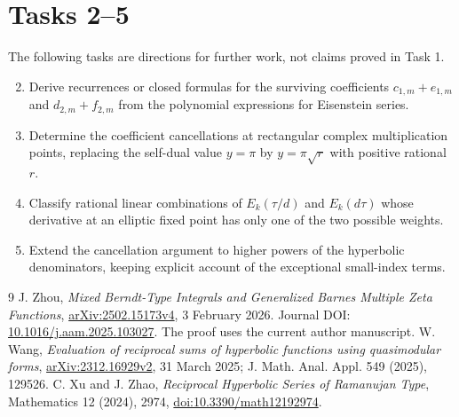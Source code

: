 \documentclass[11pt]{article}
\begin{document}
\section*{Tasks 2--5}
The following tasks are directions for further work, not claims
proved in Task 1.
\begin{enumerate}
\setcounter{enumi}{1}
\item Derive recurrences or closed formulas for the surviving
coefficients $c_{1,m}+e_{1,m}$ and $d_{2,m}+f_{2,m}$ from the
polynomial expressions for Eisenstein series.
\item Determine the coefficient cancellations at rectangular
complex multiplication points, replacing the self-dual value
$y=\pi$ by $y=\pi\sqrt r$ with positive rational $r$.
\item Classify rational linear combinations of
$E_k(\tau/d)$ and $E_k(d\tau)$ whose derivative at an elliptic
fixed point has only one of the two possible weights.
\item Extend the cancellation argument to higher powers of the
hyperbolic denominators, keeping explicit account of the
exceptional small-index terms.
\end{enumerate}

\begin{thebibliography}{9}
 J. Zhou, \emph{Mixed Berndt-Type Integrals and
Generalized Barnes Multiple Zeta Functions},
\href{https://arxiv.org/abs/2502.15173v4}{arXiv:2502.15173v4},
3 February 2026. Journal DOI:
\href{https://doi.org/10.1016/j.aam.2025.103027}
{10.1016/j.aam.2025.103027}.
The proof uses the current author manuscript.
 W. Wang, \emph{Evaluation of reciprocal sums of
hyperbolic functions using quasimodular forms},
\href{https://arxiv.org/abs/2312.16929v2}{arXiv:2312.16929v2},
31 March 2025; J. Math. Anal. Appl. 549 (2025), 129526.
 C. Xu and J. Zhao, \emph{Reciprocal Hyperbolic
Series of Ramanujan Type}, Mathematics 12 (2024), 2974,
\href{https://doi.org/10.3390/math12192974}{doi:10.3390/math12192974}.
\end{thebibliography}
\end{document}
